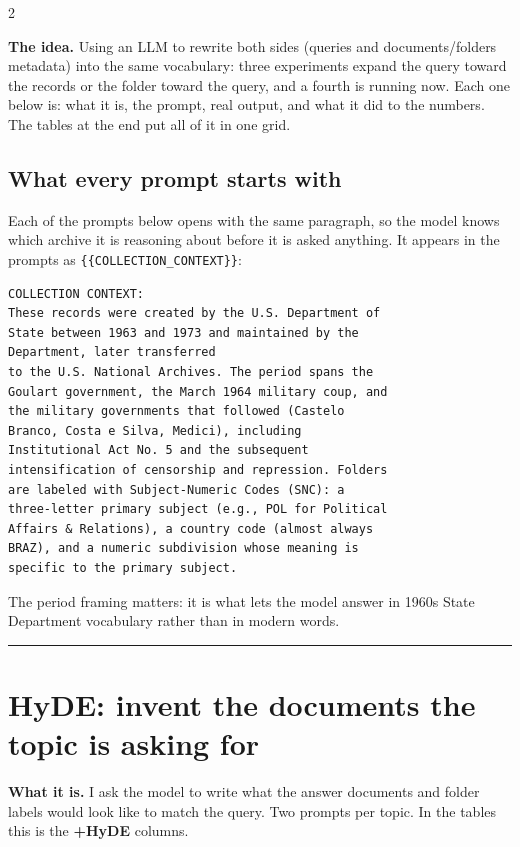 \documentclass[a4paper,11pt]{article}
\newcommand{\partrule}{\vspace{2pt}\hrule\vspace{6pt}}
\begin{document}
\vspace{-2pt}

\begin{multicols}{2}

\textbf{The idea.} Using an LLM to rewrite both sides (queries and documents/folders metadata) into the same vocabulary:
three experiments expand the query toward the records or the folder toward the query, and a
fourth is running now. Each one below is: what it is, the prompt, real output, and what it
did to the numbers. The tables at the end put all of it in one grid.

\subsection*{What every prompt starts with}

Each of the prompts below opens with the same paragraph, so the model knows which archive it
is reasoning about before it is asked anything. It appears in the prompts as
\texttt{\{\{COLLECTION\_CONTEXT\}\}}:

{\scriptsize
\begin{verbatim}
COLLECTION CONTEXT:
These records were created by the U.S. Department of
State between 1963 and 1973 and maintained by the
Department, later transferred
to the U.S. National Archives. The period spans the
Goulart government, the March 1964 military coup, and
the military governments that followed (Castelo
Branco, Costa e Silva, Medici), including
Institutional Act No. 5 and the subsequent
intensification of censorship and repression. Folders
are labeled with Subject-Numeric Codes (SNC): a
three-letter primary subject (e.g., POL for Political
Affairs & Relations), a country code (almost always
BRAZ), and a numeric subdivision whose meaning is
specific to the primary subject.
\end{verbatim}
}

The period framing matters: it is what lets the model answer in 1960s State Department
vocabulary rather than in modern words.

\partrule

\section{HyDE: invent the documents the topic is asking for}

\textbf{What it is.} I ask the model to write what the answer documents and folder labels would look like to match the query. Two prompts per
topic. In the tables this is the \textbf{+HyDE} columns.



\end{multicols}
\end{document}

